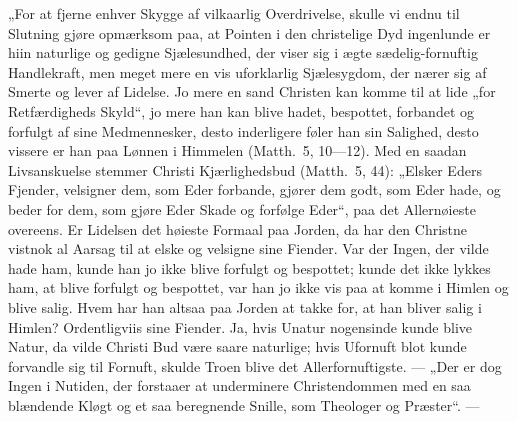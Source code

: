 \documentclass[12pt,a4paper]{book}
\begin{document}
„For at fjerne enhver Skygge af vilkaarlig Overdrivelse, skulle vi endnu til Slutning gjøre
opmærksom paa, at Pointen i den christelige Dyd ingenlunde er hiin naturlige og gedigne
Sjælesundhed, der viser sig i ægte sædelig-fornuftig Handlekraft, men meget mere en vis
uforklarlig Sjælesygdom, der nærer sig af Smerte og
lever af Lidelse. Jo mere en sand Christen kan komme til at lide „for Retfærdigheds
Skyld“, jo mere han kan blive hadet, bespottet, forbandet og forfulgt af sine Medmennesker,
desto inderligere føler han sin Salighed, desto vissere er han paa Lønnen i Himmelen
(Matth.\ 5, 10---12). Med en saadan Livsanskuelse stemmer Christi Kjærlighedsbud (Matth.\ 5,
44): „Elsker Eders Fjender, velsigner dem, som Eder forbande, gjører dem godt, som Eder
hade, og beder for dem, som gjøre Eder Skade og forfølge Eder“, paa det Allernøieste
overeens. Er Lidelsen det høieste Formaal paa Jorden, da har den Christne vistnok al Aarsag
til at elske og velsigne sine Fiender. Var der Ingen, der vilde hade ham, kunde han jo ikke
blive forfulgt og bespottet; kunde det ikke lykkes ham, at blive forfulgt og bespottet, var
han jo ikke vis paa at komme i Himlen og blive salig. Hvem har han altsaa paa Jorden at
takke for, at han bliver salig i Himlen? Ordentligviis sine Fiender. Ja, hvis Unatur
nogensinde kunde blive Natur, da vilde Christi Bud være saare naturlige; hvis Ufornuft blot
kunde forvandle sig til Fornuft, skulde Troen blive det Allerfornuftigste. --- „Der er dog
Ingen i Nutiden, der forstaaer at underminere Christendommen med en saa blændende Kløgt og
et saa beregnende Snille, som Theologer og
Præster“. ---
\end{document}
